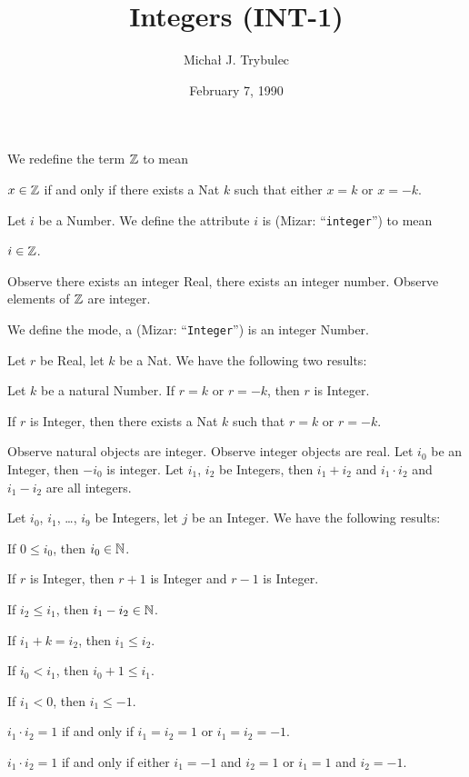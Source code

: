 \documentclass{article}
\title{Integers (INT-1)}
\author{Micha{\l} J. Trybulec}
\date{February 7, 1990}
\begin{document}
\maketitle

\begin{definition}
We redefine the term $\mathbb{Z}$ to mean
\begin{defn}
\item $x\in\mathbb{Z}$ if and only if there exists a Nat $k$ such that either
  $x=k$ or $x=-k$.
\end{defn}
\end{definition}

\begin{definition}
Let $i$ be a Number.
We define the attribute $i$ is  (Mizar: ``\verb#integer#'')
to mean
\begin{defn}
\item $i\in\mathbb{Z}$.
\end{defn}
\end{definition}

Observe there exists an integer Real, there exists an integer number.
Observe elements of $\mathbb{Z}$ are integer.

\begin{definition}
We define the mode, a  (Mizar: ``\verb#Integer#'') is an
integer Number.
\end{definition}

Let $r$ be Real, let $k$ be a Nat.
We have the following two results:
\begin{thm}
\item\label{int1:1} Let $k$ be a natural Number. If $r=k$ or $r=-k$,
  then $r$ is Integer.
\item\label{int1:2} If $r$ is Integer, then there exists a Nat $k$ such
  that $r=k$ or $r=-k$.
\end{thm}

Observe natural objects are integer. Observe integer objects are real.
Let $i_{0}$ be an Integer, then $-i_{0}$ is integer.
Let $i_{1}$, $i_{2}$ be Integers, then $i_{1}+i_{2}$ and $i_{1}\cdot i_{2}$
and $i_{1}-i_{2}$ are all integers.

Let $i_{0}$, $i_{1}$, \dots, $i_{9}$ be Integers, let $j$ be an Integer.
We have the following results:
\begin{thm}
\item\label{int1:3} If $0\leq i_{0}$, then $i_{0}\in\mathbb{N}$.
\item\label{int1:4} If $r$ is Integer, then $r+1$ is Integer and $r-1$
  is Integer.
\item\label{int1:5} If $i_{2}\leq i_{1}$, then $i_{1}-i_{2}\in\mathbb{N}$.
\item\label{int1:6} If $i_{1}+k=i_{2}$, then $i_{1}\leq i_{2}$.
\item\label{int1:7} If $i_{0}<i_{1}$, then $i_{0}+1\leq i_{1}$.
\item\label{int1:8} If $i_{1}<0$, then $i_{1}\leq-1$.
\item\label{int1:9} $i_{1}\cdot i_{2}=1$ if and only if $i_{1}=i_{2}=1$
  or $i_{1}=i_{2}=-1$.
\item\label{int1:10} $i_{1}\cdot i_{2}=1$ if and only if either
  $i_{1}=-1$ and $i_{2}=1$ or $i_{1}=1$ and $i_{2}=-1$.
\end{thm}
\end{document}
